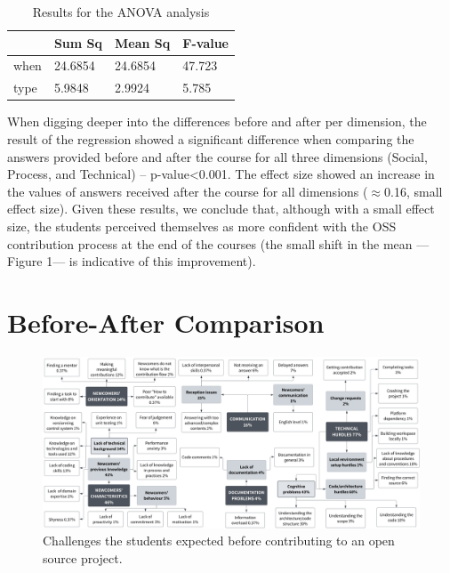 \documentclass[sigconf]{acmart}
\begin{document}
\begin{sloppy}
\begin{table}[!ht]
    \caption{Results for the ANOVA analysis}
    \centering
    \footnotesize
    \begin{tabular}{llll}
    \toprule
        ~  & Sum Sq & Mean Sq & F-value \\ \midrule
        when  & 24.6854 & 24.6854 & 47.723 \\ 
        type & 5.9848 & 2.9924 & 5.785 \\ \bottomrule
    \end{tabular}
    \vspace{-3mm}
\end{table}

When digging deeper into the differences before and after per dimension, the result of the regression showed a significant difference when comparing the answers provided before and after the course for all three dimensions (Social, Process, and Technical) – p-value<0.001. The effect size showed an increase in the values of answers received after the course for all dimensions ($\approx$0.16, small effect size). Given these results, we conclude that, although with a small effect size, the students perceived themselves as more confident with the OSS contribution process at the end of the courses (the small shift in the mean ---Figure 1--- is indicative of this improvement).




\section{Before-After Comparison}

\begin{figure}
\centering
  \includegraphics[width=1\textwidth]{BEFOREFINAL2.png}
    \caption{Challenges the students expected before contributing to an open source project.}
   \label{fig:before}
\end{figure}


\end{sloppy}
\end{document}
